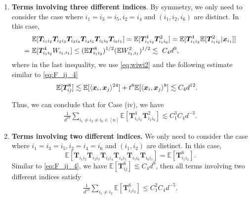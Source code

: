 \documentclass[twoside,11pt]{article}
\newcommand{\E}{\mathbb{E}}
\def\bT{{\boldsymbol T}}
\def\bx{{\boldsymbol x}}
\def\T{{\mathbb T}}
\def\T{{\mathbb T}}
\renewcommand{\T}{\boldsymbol{T}}
\newcommand{\1}{\mathbf{1}}
\begin{document}
\begin{enumerate}[label=\textbf{Case (\roman*).},leftmargin=0ex, itemindent=12ex]
\begin{align}
    =~& \E[\T_{i_1i_4}^2W_{i_1,i_1}W_{i_4,i_4}] \le \E[\T_{i_1i_4}^4]^{1/2}\E[W_{i_1,i_1}^2] \lesssim C_4 d^9,\label{eq:four_distinct_3}
\end{align}
where in the last inequality, we use \eqref{eq:wiwi2}. Combining \eqref{eq:four_distinct_1}, \eqref{eq:four_distinct_2} and \eqref{eq:four_distinct_3}, we can conclude that for Case (iii),
\begin{align}
     \frac{1}{d^{18}} \sum_{i_1,\dots, i_6 \text{ have 4 distinct indices}} \E[\T_{i_1i_2}\T_{i_2i_3}\T_{i_3i_4}\T_{i_4i_5}\T_{i_5i_6}\T_{i_6i_1}] \leq \frac{n^4}{d^{18}}  C_4d^9 \lesssim C_1^4 C_4 d^{-1}. \label{eq:case3}
\end{align}

\item \textbf{Terms involving three different indices}.  By symmetry, we only need to consider the case where $i_1=i_3=i_5,i_2=i_4$ and $(i_1,i_2,i_6)$ are distinct. In this case,  
\begin{align}
&\E[\bT_{i_1i_2}\bT_{i_2i_3}\bT_{i_3i_4}\bT_{i_4i_5}\bT_{i_5i_6}\bT_{i_6i_1}]=\E[\bT_{i_1i_2}^4\bT_{i_1i_6}^2] 
    = \E[\bT_{i_1i_2}^4\E[\bT_{i_1i_6}^2 | \bx_{i_1}  ]] \notag \\
     =~& \E[\bT_{i_1i_2}^4W_{i_1,i_1} ]   \leq (\E\bT_{i_1i_2}^8)^{1/2} (\E W_{i_1,i_1}^2)^{1/2}  
     \lesssim~ C_4 d^{9},
\end{align}
where in the last inequality, we use  \eqref{eq:wiwi2} and the following estimate similar to \eqref{eq:F_ij_4}
\begin{align}
    \E[\T_{ij}^8]&\lesssim \E[\langle \bx_i,\bx_j\rangle^{24}]+t^8\E [\langle \bx_i,\bx_j\rangle^8]\lesssim C_4 d^{12}. \notag 
\end{align}



Thus, we can conclude that for Case (iv), we have 
\begin{align}
    \frac{1}{d^{18}} \sum_{i_1\neq i_2  \neq i_6\in [n]} \E[\bT_{i_1i_2}^4\bT_{i_1i_6}^2]\lesssim C_1^3 C_4 d^{-3}. \label{eq:case4}
\end{align}

 
\item  \textbf{Terms involving two different indices.} We only need to consider the case where $i_1=i_3=i_5,i_2=i_4=i_6$ and $(i_1,i_2)$ are distinct. In this case, $$\E[\bT_{i_1i_2}\bT_{i_2i_3}\bT_{i_3i_4}\bT_{i_4i_5}\bT_{i_5i_6}\bT_{i_6i_1}]=\E[\bT_{i_1i_2}^6].$$ Similar to \eqref{eq:F_ij_4}, we  have
$\E[\bT_{ij}^6]\lesssim  C_4 d^{9}$,
then all terms involving two different indices satisfy 
\begin{align}
    \frac{1}{d^{18}}\sum_{i_1\not=i_2} \E[\bT_{i_1i_2}^6] \leq C_1^2 C_4d^{-5}. \label{eq:case5}
\end{align}


\end{enumerate}
\end{document}
